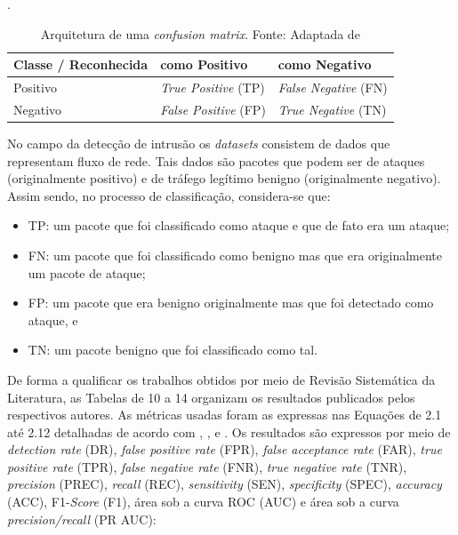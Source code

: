 \begin{table}[!htpb]\centering
\label{tab:conf_matrix}
\caption{Arquitetura de uma \textit{confusion matrix}. Fonte: Adaptada de }.

\begin{tabular}{l|l|l}
\hline
\textbf{Classe} / \textbf{Reconhecida} & \textbf{como Positivo}       & \textbf{como Negativo}       \\ \hline \hline

Positivo             & \textit{True Positive} (TP)  & \textit{False Negative} (FN) \\ \hline
Negativo             & \textit{False Positive} (FP) & \textit{True Negative} (TN)
\\ \hline
\end{tabular}
\end{table}


No campo da detecção de intrusão os \textit{datasets} consistem de dados que representam fluxo de rede. Tais dados são pacotes que podem ser de ataques (originalmente positivo) e de tráfego legítimo benigno (originalmente negativo). Assim sendo, no processo de classificação, considera-se que:

\begin{itemize}
    \item TP: um pacote que foi classificado como ataque e que de fato era um ataque;
    \item FN: um pacote que foi classificado como benigno mas que era originalmente um pacote de ataque;
    \item FP: um pacote que era benigno originalmente mas que foi detectado como ataque, e
    \item TN: um pacote benigno que foi classificado como tal.
\end{itemize}

De forma a qualificar os trabalhos obtidos por meio de Revisão Sistemática da Literatura, as Tabelas de 10 a 14 organizam os resultados publicados pelos respectivos autores. As métricas usadas foram as expressas nas Equações de 2.1 até 2.12 detalhadas de acordo com , ,  e . Os resultados são expressos por meio de \textit{detection rate} (DR), \textit{false positive rate} (FPR), \textit{false acceptance rate} (FAR), \textit{true positive rate} (TPR), \textit{false negative rate} (FNR), \textit{true negative rate} (TNR), \textit{precision} (PREC), \textit{recall} (REC), \textit{sensitivity} (SEN), \textit{specificity} (SPEC), \textit{accuracy} (ACC), F1-\textit{Score} (F1), área sob a curva ROC (AUC) e área sob a curva \textit{precision/recall} (PR AUC):


